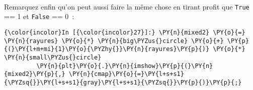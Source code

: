     \begin{center}
    \end{center}
    { \hspace*{\fill} \\}
    
    Remarquez enfin qu'on peut aussi faire la même chose en tirant profit
que \texttt{True} == 1 et \texttt{False} == 0~:

    \begin{Verbatim}[commandchars=\\\{\}]
{\color{incolor}In [{\color{incolor}27}]:} \PY{n}{mixed2} \PY{o}{=} \PY{n}{rayures} \PY{o}{*} \PY{n}{big\PYZus{}circle} \PY{o}{+} \PY{p}{(}\PY{l+m+mi}{1}\PY{o}{\PYZhy{}}\PY{n}{rayures}\PY{p}{)} \PY{o}{*} \PY{n}{small\PYZus{}circle}
         \PY{n}{plt}\PY{o}{.}\PY{n}{imshow}\PY{p}{(}\PY{n}{mixed2}\PY{p}{,} \PY{n}{cmap}\PY{o}{=}\PY{l+s+s1}{\PYZsq{}}\PY{l+s+s1}{gray}\PY{l+s+s1}{\PYZsq{}}\PY{p}{)}\PY{p}{;}
\end{Verbatim}


    \begin{center}
    \end{center}
    { \hspace*{\fill} \\}
    

    
    
    
